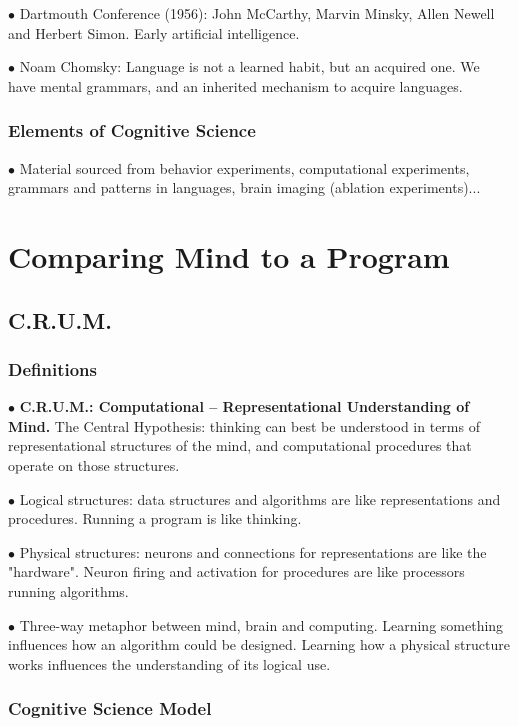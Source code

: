 \documentclass[english,openany]{book}
\begin{document}
$\bullet$ Dartmouth Conference (1956): John McCarthy, Marvin Minsky, Allen Newell and Herbert Simon. Early artificial intelligence.

$\bullet$ Noam Chomsky: Language is not a learned habit, but an acquired one. We have mental grammars, and an inherited mechanism to acquire languages.

\subsection{Elements of Cognitive Science}

$\bullet$ Material sourced from behavior experiments, computational experiments, grammars and patterns in languages, brain imaging (ablation experiments)...

\chapter{Comparing Mind to a Program}

\section{C.R.U.M.}

\subsection{Definitions}

$\bullet$ \textbf{C.R.U.M.: Computational -- Representational Understanding of Mind.} The Central Hypothesis: thinking can best be understood in terms of representational structures of the mind, and computational procedures that operate on those structures.

$\bullet$ Logical structures: data structures and algorithms are like representations and procedures. Running a program is like thinking.

$\bullet$ Physical structures: neurons and connections for representations are like the "hardware". Neuron firing and activation for procedures are like processors running algorithms.

$\bullet$ Three-way metaphor between mind, brain and computing. Learning something influences how an algorithm could be designed. Learning how a physical structure works influences the understanding of its logical use.

\subsection{Cognitive Science Model}
\end{document}
